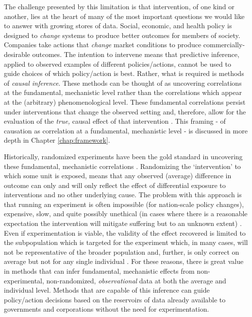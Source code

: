 \documentclass[../main.tex]{subfiles}
\begin{document}
\vspace{\baselineskip}
The challenge presented by this limitation is that intervention, of one kind or another, lies at the heart of many of the most important questions we would like to answer with growing stores of data. Social, economic, and health policy is designed to \textit{change} systems to produce better outcomes for members of society. Companies take actions that \textit{change} market conditions to produce commercially-desirable outcomes. The intention to intervene means that predictive inference, applied to observed examples of different policies/actions, cannot be used to guide choices of which policy/action is best. Rather, what is required is methods of \textit{causal inference}. These methods can be thought of as uncovering correlations at the fundamental, mechanistic level rather than the correlations which appear at the (arbitrary) phenomenological level. These fundamental correlations persist under interventions that change the observed setting and, therefore, allow for the evaluation of the \textit{true, }causal\textit{ }effect of that intervention \parencite{Scholkopf2019CausalityLearning}. This framing - of causation as correlation at a fundamental, mechanistic level - is discussed in more depth in Chapter \ref{chap:framework}.\par


\vspace{\baselineskip}
Historically, randomized experiments have been the gold standard in uncovering these fundamental, mechanistic correlations \parencite{Meldrum2000AStandard}. Randomizing the ‘intervention’ to which some unit is exposed, means that any observed (average) difference in outcome can only and will only reflect the effect of differential exposure to interventions and no other underlying cause. The problem with this approach is that running an experiment is often impossible (for nation-scale policy changes), expensive, slow, and quite possibly unethical (in cases where there is a reasonable expectation the intervention will mitigate suffering but to an unknown extent) \parencite{Meldrum2000AStandard}. Even if experimentation is viable, the validity of the effect recovered is limited to the subpopulation which is targeted for the experiment which, in many cases, will not be representative of the broader population and, further, is only correct on average but not for any single individual \parencite{Rothwell2006FactorsTrials}. For these reasons, there is great value in methods that can infer fundamental, mechanistic effects from non-experimental, non-randomized, \textit{observational} data at both the average and individual level. Methods that are capable of this inference can guide policy/action decisions based on the reservoirs of data already available to governments and corporations without the need for experimentation.\par
\end{document}
